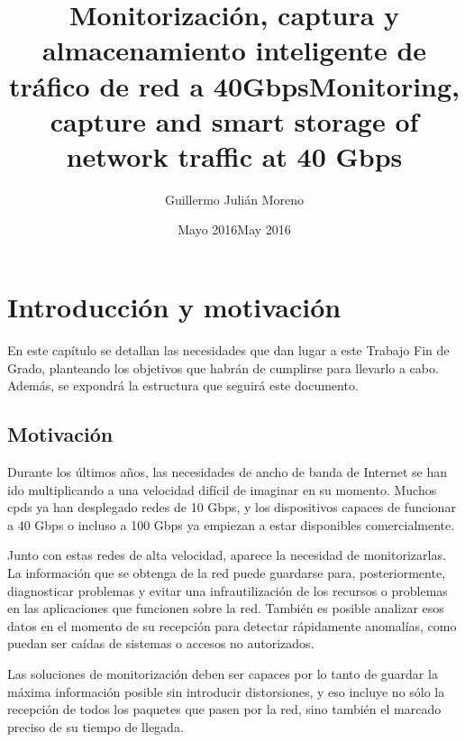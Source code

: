 \documentclass[twoside, 12pt]{epstfg}
\title[spa]{Monitorización, captura y almacenamiento inteligente de tráfico de red a 40Gbps}
\title[eng]{Monitoring, capture and smart storage of network traffic at 40 Gbps}
\author{Guillermo Julián Moreno}
\date[spa]{Mayo 2016}
\date[eng]{May 2016}
\begin{document}

\frontmatter

\maketitle[spa]

\makeinnertitle[spa]

\makeabstract[spa]
\makeabstract[eng]

\tableofcontents
\clearpage
\listoftables
\clearpage
\listoffigures
\cleardoublepage

\printnoidxglossaries

\mainmatter

\chapter{Introducción y motivación}

En este capítulo se detallan las necesidades que dan lugar a este Trabajo Fin de Grado, planteando los objetivos que habrán de cumplirse para llevarlo a cabo. Además, se expondrá la estructura que seguirá este documento.

\section{Motivación}

Durante los últimos años, las necesidades de ancho de banda de Internet se han ido multiplicando a una velocidad difícil de imaginar en su momento. Muchos \glspl{cpd} ya han desplegado redes de 10 Gbps, y los dispositivos capaces de funcionar a 40 Gbps o incluso a 100 Gbps ya empiezan a estar disponibles comercialmente.

Junto con estas redes de alta velocidad, aparece la necesidad de monitorizarlas. La información que se obtenga de la red puede guardarse para, posteriormente, diagnosticar problemas y evitar una infrautilización de los recursos o problemas en las aplicaciones que funcionen sobre la red. También es posible analizar esos datos en el momento de su recepción para detectar rápidamente anomalías, como puedan ser caídas de sistemas o accesos no autorizados.

Las soluciones de monitorización deben ser capaces por lo tanto de guardar la máxima información posible sin introducir distorsiones, y eso incluye no sólo la recepción de todos los paquetes que pasen por la red, sino también el marcado preciso de su tiempo de llegada.
\end{document}
